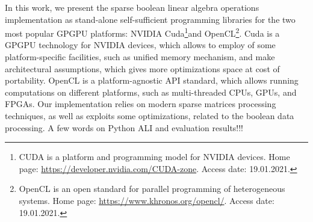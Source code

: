 In this work, we present the sparse boolean linear algebra operations implementation as stand-alone self-sufficient programming libraries for the two most popular GPGPU platforms: NVIDIA Cuda\footnote{CUDA is a platform and programming model for NVIDIA devices. Home page: \url{https://developer.nvidia.com/CUDA-zone}. Access date: 19.01.2021.}and OpenCL\footnote{OpenCL is an open standard for parallel programming of heterogeneous systems. Home page: \url{https://www.khronos.org/opencl/}. Access date: 19.01.2021.}.
Cuda is a GPGPU technology for NVIDIA devices, which allows to employ of some platform-specific facilities, such as unified memory mechanism, and make architectural assumptions, which gives more optimizations space at cost of portability. 
OpenCL is a platform-agnostic API standard, which allows running computations on different platforms, such as multi-threaded CPUs, GPUs, and FPGAs.
Our implementation relies on modern sparse matrices processing techniques, as well as exploits some optimizations, related to the boolean data processing.
A few words on Python ALI and evaluation results!!!